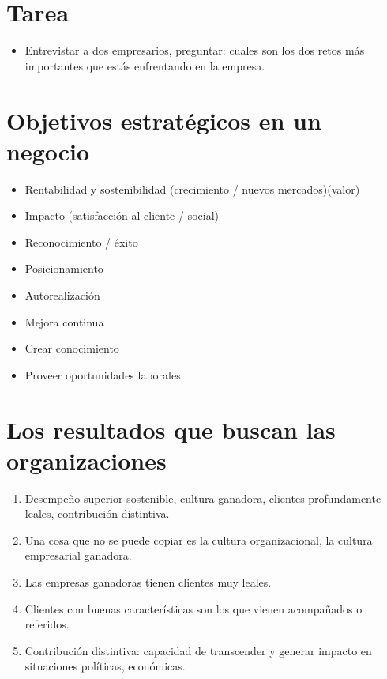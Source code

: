 
\section{Tarea}
\begin{itemize}
    \item Entrevistar a dos empresarios, preguntar: cuales son los dos retos más importantes que estás enfrentando en la empresa.
\end{itemize}


\section{Objetivos estratégicos en un negocio}
\begin{itemize}
    \item Rentabilidad y sostenibilidad (crecimiento / nuevos mercados)(valor) 
    \item Impacto (satisfacción al cliente / social)
    \item Reconocimiento / éxito
    \item Posicionamiento 
    \item Autorealización 
    \item Mejora continua 
    \item Crear conocimiento 
    \item Proveer oportunidades laborales
\end{itemize}


\section{Los resultados que buscan las organizaciones}
\begin{enumerate}
    \item Desempeño superior sostenible, cultura ganadora, clientes profundamente leales, contribución distintiva.
    \item Una cosa que no se puede copiar es la cultura organizacional, la cultura empresarial ganadora.
    \item Las empresas ganadoras tienen clientes muy leales.
    \item Clientes con buenas características son los que vienen acompañados o referidos.
    \item Contribución distintiva: capacidad de transcender y generar impacto en situaciones políticas, económicas.
\end{enumerate}

